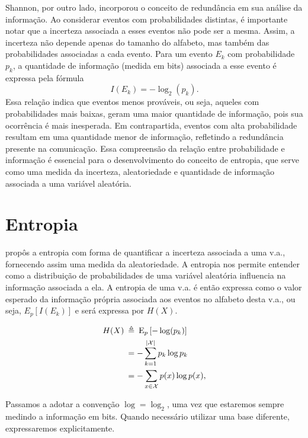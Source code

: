 Shannon, por outro lado, incorporou o conceito de redundância em sua análise da
informação. Ao considerar eventos com probabilidades distintas, é importante
notar que a incerteza associada a esses eventos não pode ser a mesma. Assim, a
incerteza não depende apenas do tamanho do alfabeto, mas também das
probabilidades associadas a cada evento. Para um evento $E_k$ com probabilidade
$p_k$, a quantidade de informação (medida em bits) associada a esse evento é
expressa pela fórmula
%
\begin{equation}\label{eq-info-prop}
I(E_k) = − \log_2 (p_k) . 
\end{equation}
%
Essa relação indica que eventos menos prováveis, ou seja, aqueles com
probabilidades mais baixas, geram uma maior quantidade de informação, pois sua
ocorrência é mais inesperada. Em contrapartida, eventos com alta probabilidade
resultam em uma quantidade menor de informação, refletindo a redundância
presente na comunicação. Essa compreensão da relação entre probabilidade e
informação é essencial para o desenvolvimento do conceito de entropia, que
serve como uma medida da incerteza, aleatoriedade e quantidade de informação
associada a uma variável aleatória.

\section{Entropia}\label{sec:entropy}

\textcite{shannon1948} propôs a entropia com forma de quantificar a incerteza
associada a uma v.a., fornecendo assim uma medida da aleatoriedade.
A entropia nos permite entender como a distribuição de probabilidades de uma
variável aleatória influencia na informação associada a ela. A
entropia de uma v.a. é então expressa como o valor esperado da informação própria
associada aos eventos no alfabeto desta v.a., ou seja, $E_p[I(E_k)]$ e será
expressa por $H(X)$.
\begin{definition}[Entropia]
\begin{subequations}\label{eq:entropy-def}
\begin{align}
  H(X) \: &\triangleq \: \mathrm{E}_p \left[ -\log(p_k) \right] \\
       & = - \sum_{k=1}^{\vert \mathcal{X} \vert} p_k \log p_k \\
       & = - \sum_{x \in \mathcal{X}} p(x) \log p(x) ,
\end{align}
\end{subequations}
\end{definition}
Passamos a adotar a convenção $\log = \log_2$, uma vez que estaremos
sempre medindo a informação em bits. Quando necessário utilizar uma base
diferente, expressaremos explicitamente.

